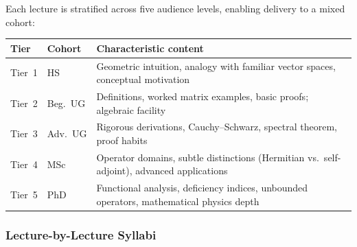 \documentclass[11pt,a4paper]{article}
\begin{document}
Each lecture is stratified across five audience levels, enabling delivery to a mixed cohort:

\begin{center}
\begin{tabular}{llp{9cm}}
\toprule
\textbf{Tier} & \textbf{Cohort} & \textbf{Characteristic content}\\
\midrule
Tier~1 & HS       & Geometric intuition, analogy with familiar vector spaces, conceptual motivation\\
Tier~2 & Beg.\ UG & Definitions, worked matrix examples, basic proofs; algebraic facility\\
Tier~3 & Adv.\ UG & Rigorous derivations, Cauchy--Schwarz, spectral theorem, proof habits\\
Tier~4 & MSc      & Operator domains, subtle distinctions (Hermitian vs.\ self-adjoint), advanced applications\\
Tier~5 & PhD      & Functional analysis, deficiency indices, unbounded operators, mathematical physics depth\\
\bottomrule
\end{tabular}
\end{center}

\subsubsection*{Lecture-by-Lecture Syllabi}
\end{document}
